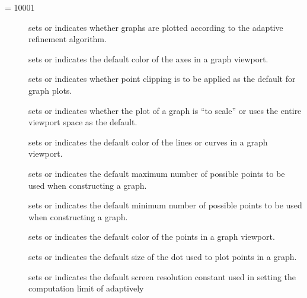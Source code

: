 %
\bgroup\hbadness = 10001\sloppy
\begin{description}
%
\item[]
sets or indicates whether graphs are plotted
according to the adaptive refinement algorithm.
%
\item[]
sets or indicates the default color of the
axes in a \twodim{} graph viewport.
%
\item[]
sets or
indicates whether point clipping is
to be applied as the default for graph plots.
%
\item[]
sets or
indicates whether the plot of a graph
is ``to scale'' or uses the entire viewport space as the default.
%
\item[]
sets or indicates the default color of the
lines or curves in a \twodim{} graph viewport.
%
\item[]
sets or indicates
the default maximum number of
possible points to be used when constructing a \twodim{} graph.
%
\item[]
sets or indicates the default minimum number of
possible points to be used when constructing a \twodim{} graph.
%
\item[]
sets or indicates the default color of the
points in a \twodim{} graph viewport.
%
\item[]
sets or indicates the default size of the
dot used to plot points in a \twodim{} graph.
%
\item[]
sets or indicates the default screen
resolution constant used in setting the computation limit of adaptively

\end{description}
